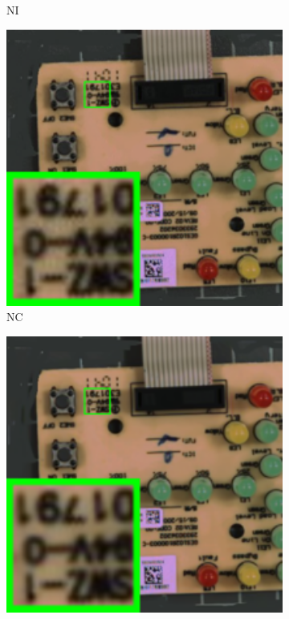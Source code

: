 \begin{figure}
\begin{subfigure}[t]{0.19\textwidth}
\caption{NI}
    \end{subfigure}
\hfill
    \begin{subfigure}[t]{0.19\textwidth}
        \centering
        \includegraphics[width=1\textwidth]{images/mcwnnm/nc/resize_br_NC_circuit.png}
		\caption{NC}
    \end{subfigure}
    \hfill
    \begin{subfigure}[t]{0.19\textwidth}
        \centering
        \includegraphics[width=1\textwidth]{images/mcwnnm/nc/resize_br_WNNMcw_circuit.png}

\end{subfigure}
\end{figure}
